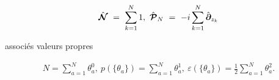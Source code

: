\begin{eqnarray}
	\hat{\bm{ \mathcal{N}}} ~ = ~ \sum_{k = 1}^N 1,~\hat{\bm{ \mathcal{P}}}_N  ~=~- i\sum_{k = 1}^N \hat{\bm{\partial}}_{z_k}	
\end{eqnarray}

associés valeurs propres 

\begin{eqnarray}
	N = \sum_{a = 1}^N \theta_a^0 , ~ p(\{\theta_a\}) = \sum_{a = 1}^N \theta_a^1 ,~\varepsilon(\{\theta_a\}) = \frac{1}{2}\sum_{a = 1}^N \theta_a^2.	
\end{eqnarray}
